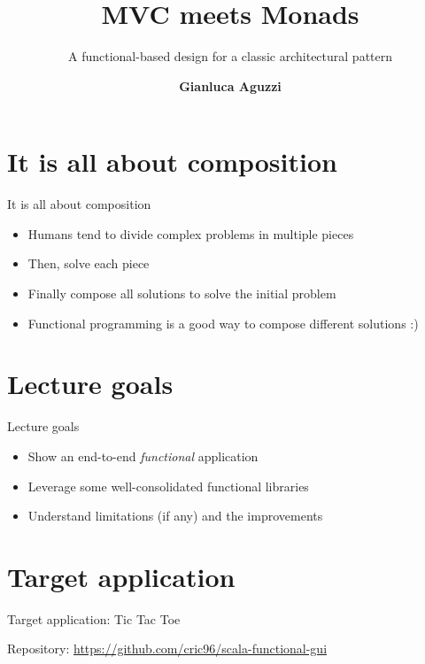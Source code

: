 \documentclass[presentation]{beamer}
\title[MVC Meets Monad]{MVC meets Monads}
\subtitle{A functional-based design for a classic architectural pattern}
\author[G.Aguzzi]
{\textbf{Gianluca Aguzzi}}
\institute[shortinst]{\normalsize 
\textsc{Alma Mater Studiorum}--Universit\`a di Bologna, Cesena, Italy 
}
\let\oldcite\cite
\renewcommand{\cite}[1]{{\color{blue}\oldcite{#1}}}
\begin{document}

\section{It is all about composition}
\begin{frame}[fragile]{It is all about composition \cite{milewski2019category}}
\begin{itemize}
\item Humans tend to divide complex problems in multiple pieces
\item Then, solve each piece
\item Finally compose all solutions to solve the initial problem
\item Functional programming is a good way to compose different solutions :)
\end{itemize}


\section{Lecture goals}
\end{frame}
\begin{frame}[fragile]{Lecture goals}
\begin{itemize}
\item Show an end-to-end \emph{functional} application
\item Leverage some well-consolidated functional libraries
\item Understand limitations (if any) and the improvements
\end{itemize}
\end{frame}

\section{Target application}
\begin{frame}[fragile]{Target application: Tic Tac Toe}
\begin{center}
  Repository: \url{https://github.com/cric96/scala-functional-gui}
\end{center}
\end{frame}
\end{document}
